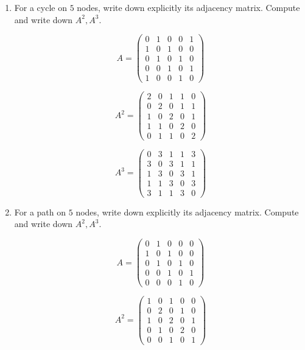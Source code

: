 \documentclass{article}
\begin{document}
\begin{enumerate}
    \item For a cycle on $5$ nodes, write down explicitly its adjacency matrix. Compute and write down $A^2,A^3$. 
    
    \begin{equation}
        A = \begin{pmatrix}
            0 & 1 & 0 & 0 & 1 \\
            1 & 0 & 1 & 0 & 0 \\
            0 & 1 & 0 & 1 & 0 \\
            0 & 0 & 1 & 0 & 1 \\
            1 & 0 & 0 & 1 & 0
        \end{pmatrix}
    \end{equation}

    $$A^2 = \begin{pmatrix}
2 & 0 & 1 & 1 & 0 \\
0 & 2 & 0 & 1 & 1 \\
1 & 0 & 2 & 0 & 1 \\
1 & 1 & 0 & 2 & 0 \\
0 & 1 & 1 & 0 & 2
\end{pmatrix}$$

$$A^3 = \begin{pmatrix}
0 & 3 & 1 & 1 & 3 \\
3 & 0 & 3 & 1 & 1 \\
1 & 3 & 0 & 3 & 1 \\
1 & 1 & 3 & 0 & 3 \\
3 & 1 & 1 & 3 & 0
\end{pmatrix}$$

    \item For a path on $5$ nodes, write down explicitly its adjacency matrix. Compute and write down $A^2,A^3$.
    
    $$A = \begin{pmatrix} 0 & 1 & 0 & 0 & 0 \\ 1 & 0 & 1 & 0 & 0 \\ 0 & 1 & 0 & 1 & 0 \\ 0 & 0 & 1 & 0 & 1 \\ 0 & 0 & 0 & 1 & 0 \end{pmatrix}$$

    $$A^2 = \begin{pmatrix} 1 & 0 & 1 & 0 & 0 \\ 0 & 2 & 0 & 1 & 0 \\ 1 & 0 & 2 & 0 & 1 \\ 0 & 1 & 0 & 2 & 0 \\ 0 & 0 & 1 & 0 & 1 \end{pmatrix}$$


\end{enumerate}
\end{document}
